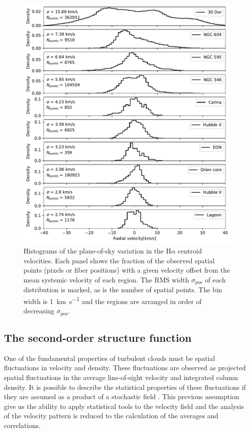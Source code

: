\documentclass[fleqn,usenatbib, useAMS, a4paper]{mnras}
\newcommand\pos{\ensuremath{_{\mathrm{pos}}}}
\newcommand\ha{\ensuremath{\text{H}\alpha}}
\begin{document}
\begin{figure}
 \centering
 \includegraphics[width=5in]{Figures/Hist}\par
 \caption{
   Histograms of the plane-of-sky variation in the \ha{} centroid velocities.
   Each panel shows the fraction of the observed spatial points
   (pixels or fiber positions)
   with a given velocity offset from the mean systemic velocity of each region.
   The RMS width \(\sigma\pos\) of each distribution is marked,
   as is the number of spatial points.
   The bin width is \SI{1}{km.s^{-1}} and the regions are arranged
   in order of decreasing \(\sigma\pos\).
 }
 \label{fig:hist}
\end{figure}


\subsection{The second-order structure function}
\label{sec:second-order-struct}
One of the fundamental properties of turbulent clouds must be spatial fluctuations in velocity and density.                                     
These fluctuations are observed as projected spatial fluctuations in the average line-of-sight velocity and integrated column density.
It is possible to describe the statistical properties of these fluctuations if they are assumed as a product of a stochastic field \citep{1984ApJ...277..556S}. 
This previous assumption give us the ability to apply statistical tools to the velocity field and the analysis of the velocity pattern is reduced to the calculation of the averages and correlations.
\end{document}
